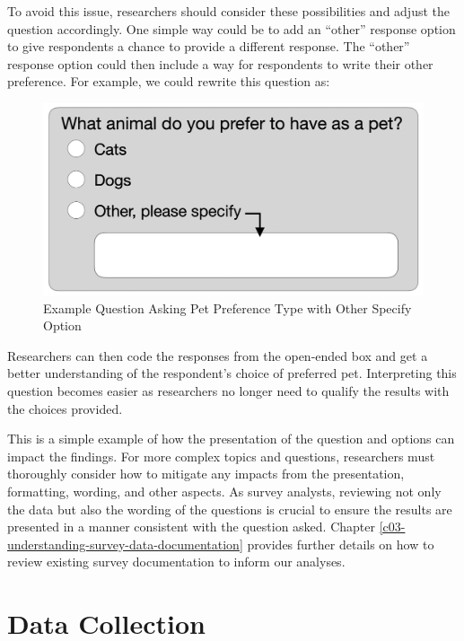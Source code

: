 \documentclass[
]{krantz}
\begin{document}
To avoid this issue, researchers should consider these possibilities and adjust the question accordingly. One simple way could be to add an ``other'' response option to give respondents a chance to provide a different response. The ``other'' response option could then include a way for respondents to write their other preference. For example, we could rewrite this question as:

\begin{figure}

{\centering \includegraphics[width=0.7\linewidth]{images/PetExample2} 

}

\caption{Example Question Asking Pet Preference Type with Other Specify Option}\label{fig:overview-pet-examp2}
\end{figure}

Researchers can then code the responses from the open-ended box and get a better understanding of the respondent's choice of preferred pet. Interpreting this question becomes easier as researchers no longer need to qualify the results with the choices provided.

This is a simple example of how the presentation of the question and options can impact the findings. For more complex topics and questions, researchers must thoroughly consider how to mitigate any impacts from the presentation, formatting, wording, and other aspects. As survey analysts, reviewing not only the data but also the wording of the questions is crucial to ensure the results are presented in a manner consistent with the question asked. Chapter \ref{c03-understanding-survey-data-documentation} provides further details on how to review existing survey documentation to inform our analyses.

\hypertarget{overview-datacollection}{%
\section{Data Collection}\label{overview-datacollection}}
\end{document}
